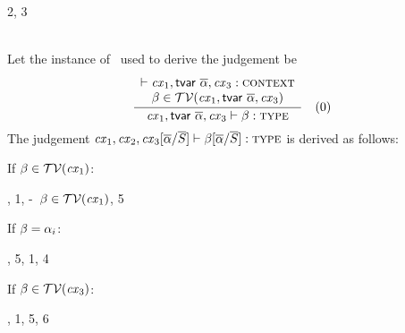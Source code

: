 \begin{bycase}

\Case{\Rtbool}
\begin{derivation}
\steP{\tsbslash{\bool}{\tvarIS}{\typIS}=\bool}
     {2, 3}
\end{derivation}

\Case{\Rtvar}\\
Let the instance of \Rtvar\ used to derive the judgement be
\[
\frac{\begin{array}{c}\vdash\mathit{cx}_1,\mathsf{tvar}\ \overline{\alpha},\mathit{cx}_3:\textsc{context}\\\beta\in\mathcal{TV}(\mathit{cx}_1,\mathsf{tvar}\ \overline{\alpha},\mathit{cx}_3)\end{array}}{\mathit{cx}_1,\mathsf{tvar}\ \overline{\alpha},\mathit{cx}_3\vdash\beta:\textsc{type}}\quad\mbox{(0)}
\]
The judgement
$\mathit{cx}_1,\mathit{cx}_2,\mathit{cx}_3[\overline{\alpha}/\overline{S}]\vdash\beta[\overline{\alpha}/\overline{S}]:\textsc{type}$ is derived as follows:
\begin{derivation}
\end{derivation}
If $\beta\in\mathcal{TV}(\mathit{cx}_1)$:
\begin{derivatioN}{3}
     {\Rtvar, 1, \hyp\ $\beta\in\mathcal{TV}(\mathit{cx}_1)$, 5}
\end{derivatioN}
If $\beta=\alpha_i$:
\begin{derivatioN}{3}
     {, 5, 1, 4}
\end{derivatioN}
If $\beta\in\mathcal{TV}(\mathit{cx}_3)$:
\begin{derivatioN}{3}
     {\Rtvar, 1, 5, 6}
\end{derivatioN}


\end{bycase}
